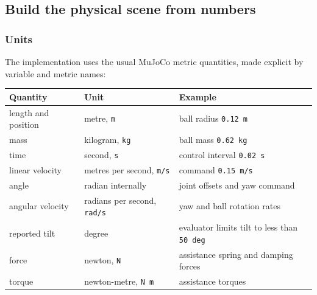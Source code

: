 \documentclass[
  american,
  11pt,
  letterpaper,
]{article}
\newcounter{none} %
\begin{document}
\subsection{Build the physical scene from
numbers}\label{build-the-physical-scene-from-numbers}

\subsubsection{Units}\label{units}

The implementation uses the usual MuJoCo metric quantities, made
explicit by variable and metric names:

{\def\LTcaptype{none} %
\begin{longtable}[]{@{}
  >{\raggedright\arraybackslash}p{}
  >{\raggedright\arraybackslash}p{}
  >{\raggedright\arraybackslash}p{}@{}}
\toprule\noalign{}
\begin{minipage}[b]{\linewidth}\raggedright
Quantity
\end{minipage} & \begin{minipage}[b]{\linewidth}\raggedright
Unit
\end{minipage} & \begin{minipage}[b]{\linewidth}\raggedright
Example
\end{minipage} \\
\midrule\noalign{}
\endhead
\bottomrule\noalign{}
\endlastfoot
length and position & metre, \texttt{m} & ball radius
\texttt{0.12\ m} \\
mass & kilogram, \texttt{kg} & ball mass \texttt{0.62\ kg} \\
time & second, \texttt{s} & control interval \texttt{0.02\ s} \\
linear velocity & metres per second, \texttt{m/s} & command
\texttt{0.15\ m/s} \\
angle & radian internally & joint offsets and yaw command \\
angular velocity & radians per second, \texttt{rad/s} & yaw and ball
rotation rates \\
reported tilt & degree & evaluator limits tilt to less than
\texttt{50\ deg} \\
force & newton, \texttt{N} & assistance spring and damping forces \\
torque & newton-metre, \texttt{N\ m} & assistance torques \\
\end{longtable}
}
\end{document}
